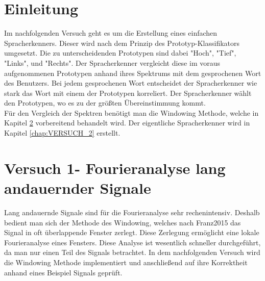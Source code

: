 \documentclass[12pt,oneside,a4paper]{report}
\begin{document}




\clearpage

%
%


%
%


%
%


%
%




\setcounter{page}{1}
%
%
\chapter{Einleitung}
\label{chap:EINL}
Im nachfolgenden Versuch geht es um die Erstellung eines einfachen Spracherkenners. Dieser wird nach dem Prinzip des Prototyp-Klassifikators umgesetzt. Die zu unterscheidenden Prototypen sind dabei "Hoch", "Tief", "Links", und "Rechts". Der Spracherkenner vergleicht diese im voraus aufgenommenen Prototypen anhand ihres Spektrums mit dem gesprochenen Wort des Benutzers. Bei jedem gesprochenen Wort entscheidet der Spracherkenner wie stark das Wort mit einem der Prototypen korreliert.
Der Spracherkenner wählt den Prototypen, wo es zu der größten Übereinstimmung kommt. \\
Für den Vergleich der Spektren benötigt man die Windowing Methode, welche in Kapitel \ref{chap:VERSUCH_1} vorbereitend behandelt wird.
Der eigentliche Spracherkenner wird in Kapitel \ref{chap:VERSUCH_2} erstellt.



%
%
\chapter{Versuch 1- Fourieranalyse lang andauernder Signale}
\label{chap:VERSUCH_1}

Lang andauernde Signale sind für die Fourieranalyse sehr rechenintensiv. Deshalb bedient man sich der Methode des Windowing, welches nach Franz2015 \cite{Franz2015i} das Signal in oft überlappende Fenster zerlegt. Diese Zerlegung ermöglicht eine lokale Fourieranalyse eines Fensters. Diese Analyse ist wesentlich schneller durchgeführt, da man nur einen Teil des Signals betrachtet.
In dem nachfolgenden Versuch wird die Windowing Methode implementiert und anschließend auf ihre Korrektheit anhand eines Beispiel Signals geprüft.
\end{document}
